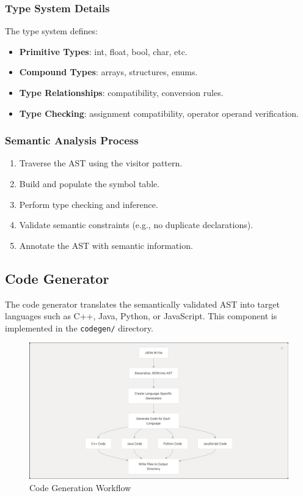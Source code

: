 \documentclass[conference]{IEEEtran}
\begin{document}
\subsubsection{Type System Details} %
The type system defines:
\begin{itemize}
    \item \textbf{Primitive Types}: int, float, bool, char, etc.
    \item \textbf{Compound Types}: arrays, structures, enums.
    \item \textbf{Type Relationships}: compatibility, conversion rules.
    \item \textbf{Type Checking}: assignment compatibility, operator operand verification.
\end{itemize}

\subsubsection{Semantic Analysis Process}
\begin{enumerate}
    \item Traverse the AST using the visitor pattern.
    \item Build and populate the symbol table.
    \item Perform type checking and inference.
    \item Validate semantic constraints (e.g., no duplicate declarations).
    \item Annotate the AST with semantic information.
\end{enumerate}

\subsection{Code Generator}
The code generator translates the semantically validated AST into target languages such as C++, Java, Python, or JavaScript. This component is implemented in the \texttt{codegen/} directory.
\begin{figure}[H] %
    \centering
    \includegraphics[width=1\linewidth]{codegen_flow.png} %
    \caption{Code Generation Workflow}
    \label{fig:codegen_flow} %
\end{figure}
\end{document}
